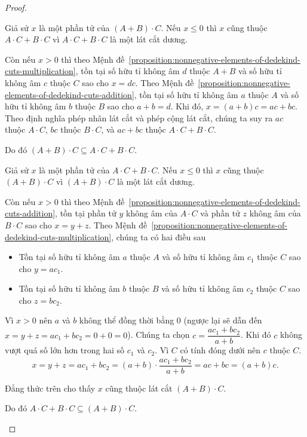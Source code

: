 \begin{proof}
\begin{enumerate}[label={\textbf{Trường hợp \arabic*.}},itemindent=2cm]
              Giả sử $x$ là một phần tử của $(A + B)\cdot C$. Nếu $x\leq 0$ thì $x$ cũng thuộc $A\cdot C + B\cdot C$ vì $A\cdot C + B\cdot C$ là một lát cắt dương.

              Còn nếu $x > 0$ thì theo Mệnh đề~\ref{proposition:nonnegative-elements-of-dedekind-cuts-multiplication}, tồn tại số hữu tỉ không âm $d$ thuộc $A + B$ và số hữu tỉ không âm $c$ thuộc $C$ sao cho $x = dc$. Theo Mệnh đề~\ref{proposition:nonnegative-elements-of-dedekind-cuts-addition}, tồn tại số hữu tỉ không âm $a$ thuộc $A$ và số hữu tỉ không âm $b$ thuộc $B$ sao cho $a + b = d$. Khi đó, $x = (a + b)c = ac + bc$. Theo định nghĩa phép nhân lát cắt và phép cộng lát cắt, chúng ta suy ra $ac$ thuộc $A\cdot C$, $bc$ thuộc $B\cdot C$, và $ac + bc$ thuộc $A\cdot C + B\cdot C$.

              Do đó $(A + B)\cdot C \subseteq A\cdot C + B\cdot C$.

              Giả sử $x$ là một phần tử của $A\cdot C + B\cdot C$. Nếu $x\leq 0$ thì $x$ cũng thuộc $(A + B)\cdot C$ vì $(A + B)\cdot C$ là một lát cắt dương.

              Còn nếu $x > 0$ thì theo Mệnh đề~\ref{proposition:nonnegative-elements-of-dedekind-cuts-addition}, tồn tại phần tử $y$ không âm của $A\cdot C$ và phần tử $z$ không âm của $B\cdot C$ sao cho $x = y + z$. Theo Mệnh đề~\ref{proposition:nonnegative-elements-of-dedekind-cuts-multiplication}, chúng ta có hai điều sau
              \begin{itemize}
                  \item Tồn tại số hữu tỉ không âm $a$ thuộc $A$ và số hữu tỉ không âm $c_{1}$ thuộc $C$ sao cho $y = ac_{1}$.
                  \item Tồn tại số hữu tỉ không âm $b$ thuộc $B$ và số hữu tỉ không âm $c_{2}$ thuộc $C$ sao cho $z = bc_{2}$.
              \end{itemize}

              Vì $x > 0$ nên $a$ và $b$ không thể đồng thời bằng $0$ (ngược lại sẽ dẫn đến $x = y + z = ac_{1} + bc_{2} = 0 + 0 = 0$). Chúng ta chọn $c = \dfrac{ac_{1} + bc_{2}}{a + b}$. Khi đó $c$ không vượt quá số lớn hơn trong hai số $c_{1}$ và $c_{2}$. Vì $C$ có tính đóng dưới nên $c$ thuộc $C$.
              \[
                  x = y + z = ac_{1} + bc_{2} = (a + b)\cdot\frac{ac_{1} + bc_{2}}{a + b} = ac + bc = (a + b)c.
              \]

              Đẳng thức trên cho thấy $x$ cũng thuộc lát cắt $(A + B)\cdot C$.

              Do đó $A\cdot C + B\cdot C \subseteq (A + B)\cdot C$.


\end{enumerate}
\end{proof}
